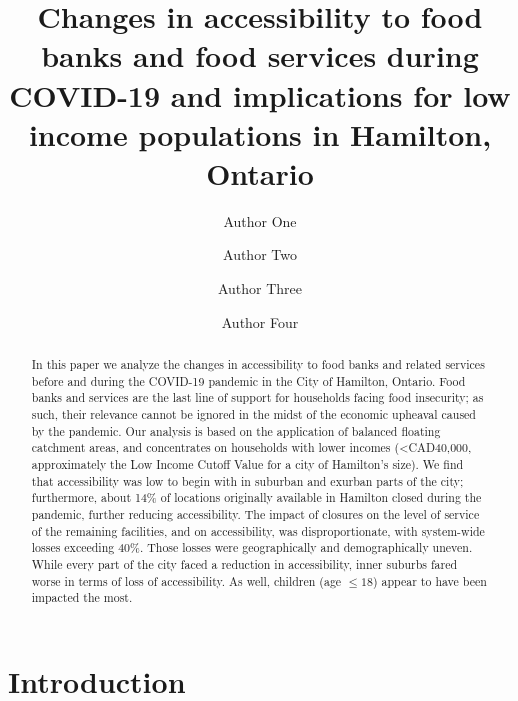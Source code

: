 \documentclass[]{elsarticle} %
\begin{document}
\begin{frontmatter}

  \title{Changes in accessibility to food banks and food services during
COVID-19 and implications for low income populations in Hamilton,
Ontario}
    \author[Some University]{Author One}
    \author[Another University]{Author Two}
    \author[Some University]{Author Three}
    \author[Some University]{Author Four}
      \address[Some University]{Department, Street, City, State, Zip}
    \address[Another University]{Department, Street, City, State, Zip}
  
  \begin{abstract}
  In this paper we analyze the changes in accessibility to food banks
  and related services before and during the COVID-19 pandemic in the
  City of Hamilton, Ontario. Food banks and services are the last line
  of support for households facing food insecurity; as such, their
  relevance cannot be ignored in the midst of the economic upheaval
  caused by the pandemic. Our analysis is based on the application of
  balanced floating catchment areas, and concentrates on households with
  lower incomes (\textless CAD40,000, approximately the Low Income
  Cutoff Value for a city of Hamilton's size). We find that
  accessibility was low to begin with in suburban and exurban parts of
  the city; furthermore, about 14\% of locations originally available in
  Hamilton closed during the pandemic, further reducing accessibility.
  The impact of closures on the level of service of the remaining
  facilities, and on accessibility, was disproportionate, with
  system-wide losses exceeding 40\%. Those losses were geographically
  and demographically uneven. While every part of the city faced a
  reduction in accessibility, inner suburbs fared worse in terms of loss
  of accessibility. As well, children (age \(\le 18\)) appear to have
  been impacted the most.
  \end{abstract}
  
 \end{frontmatter}

\hypertarget{introduction}{%
\section{Introduction}\label{introduction}}
\end{document}

